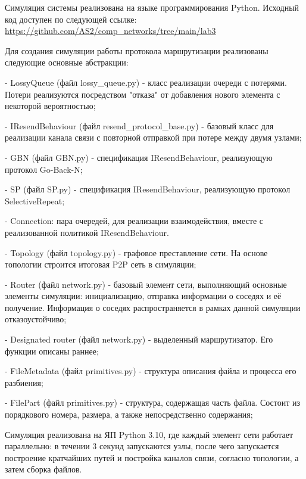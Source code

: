 Симуляция системы реализована на языке программирования Python. Исходный код доступен по следующей ссылке: \\
\hyperlink{https://github.com/AS2/comp\_networks/tree/main/lab3}{https://github.com/AS2/comp\_networks/tree/main/lab3}

Для создания симуляции работы протокола маршрутизации реализованы следующие основные абстракции:

- LossyQueue (файл lossy\_queue.py) - класс реализации очереди с потерями. Потери реализуются посредством "отказа" от добавления нового элемента с некоторой вероятностью;

- IResendBehaviour (файл resend\_protocol\_base.py) - базовый класс для реализации канала связи с повторной отправкой при потере между двумя узлами;

- GBN (файл GBN.py) - спецификация IResendBehaviour, реализующую протокол Go-Back-N;

- SP (файл SP.py) - спецификация IResendBehaviour, реализующую протокол SelectiveRepeat; 

- Connection: пара очередей, для реализации взаимодействия, вместе с реализованной политикой IResendBehaviour.

- Topology (файл topology.py) - графовое преставление сети. На основе топологии строится итоговая P2P сеть в симуляции;

- Router (файл network.py) - базовый элемент сети, выполняющий основные элементы симуляции: инициализацию, отправка информации о соседях и её получение. Информация о соседях распространяется в рамках данной симуляции отказоустойчиво;

- Designated router (файл network.py) - выделенный маршрутизатор. Его функции описаны раннее;

- FileMetadata (файл primitives.py) - структура описания файла и процесса его разбиения;

- FilePart (файл primitives.py) - структура, содержащая часть файла. Состоит из порядкового номера, размера, а также непосредственно содержания;

Симуляция реализована на ЯП Python 3.10, где каждый элемент сети работает параллельно: в течении 3 секунд запускаются узлы, после чего запускается построение кратчайших путей и постройка каналов связи, согласно топологии, а затем сборка файлов.

